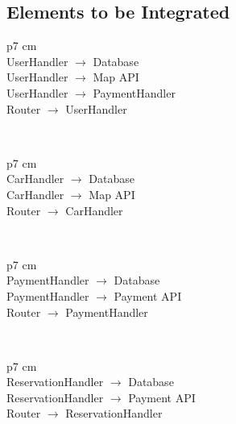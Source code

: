 \subsection{Elements to be Integrated}
    \begin{tabular}{ p{7 cm} }
      \hline
       \\
      \hline
      UserHandler  $ \rightarrow $  Database \\ \hline
      UserHandler $ \rightarrow $ Map API \\ \hline
      UserHandler $ \rightarrow  $ PaymentHandler \\ \hline
      Router $ \rightarrow $ UserHandler \\
      \hline
      \vspace{1mm}
    \end{tabular}
    \\
    \begin{tabular}{ p{7 cm} }
      \hline
       \\
      \hline
      CarHandler $ \rightarrow $ Database \\ \hline
      CarHandler $ \rightarrow $ Map API \\ \hline
      Router $ \rightarrow $ CarHandler \\
      \hline
      \vspace{1mm}
    \end{tabular}
    \\
    \begin{tabular}{ p{7 cm} }
      \hline
       \\
      \hline
      PaymentHandler $ \rightarrow $ Database \\ \hline
      PaymentHandler $ \rightarrow $ Payment API \\ \hline
      Router $ \rightarrow $ PaymentHandler \\
      \hline
      \vspace{1mm}
    \end{tabular}
    \\
    \begin{tabular}{ p{7 cm} }
      \hline
       \\
      \hline
      ReservationHandler $ \rightarrow $ Database \\ \hline
      ReservationHandler $ \rightarrow $ Payment API \\ \hline
      Router $ \rightarrow $ ReservationHandler \\
      \hline
      \vspace{1mm}
    \end{tabular}
